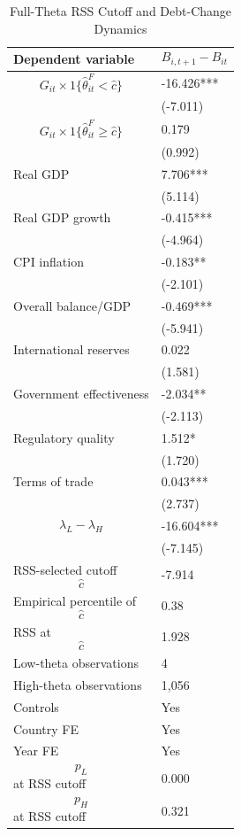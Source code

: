 \begin{table}[H]\centering
\begin{threeparttable}
\caption{Full-Theta RSS Cutoff and Debt-Change Dynamics}
\label{tab:deltaB_rss_cutoff_fulltheta}
\scriptsize
\begin{tabularx}{\textwidth}{lY}
\toprule
Dependent variable & $$B_{i,t+1}-B_{it}$$ \\
\midrule
$$G_{it}\times 1\{\widehat{\theta}^{F}_{it}<\widehat{c}\}$$ & -16.426*** \\
 & (-7.011) \\
$$G_{it}\times 1\{\widehat{\theta}^{F}_{it}\geq\widehat{c}\}$$ & 0.179 \\
 & (0.992) \\
Real GDP & 7.706*** \\
 & (5.114) \\
Real GDP growth & -0.415*** \\
 & (-4.964) \\
CPI inflation & -0.183** \\
 & (-2.101) \\
Overall balance/GDP & -0.469*** \\
 & (-5.941) \\
International reserves & 0.022 \\
 & (1.581) \\
Government effectiveness & -2.034** \\
 & (-2.113) \\
Regulatory quality & 1.512* \\
 & (1.720) \\
Terms of trade & 0.043*** \\
 & (2.737) \\
$$\lambda_L-\lambda_H$$ & -16.604*** \\
 & (-7.145) \\
\midrule
RSS-selected cutoff $$\widehat{c}$$ & -7.914 \\
Empirical percentile of $$\widehat{c}$$ & 0.38 \\
RSS at $$\widehat{c}$$ & 1.928 \\
Low-theta observations & 4 \\
High-theta observations & 1,056 \\
Controls & Yes \\
Country FE & Yes \\
Year FE & Yes \\
$$p_L$$ at RSS cutoff & 0.000 \\
$$p_H$$ at RSS cutoff & 0.321 \\

\end{tabularx}
\end{threeparttable}
\end{table}
